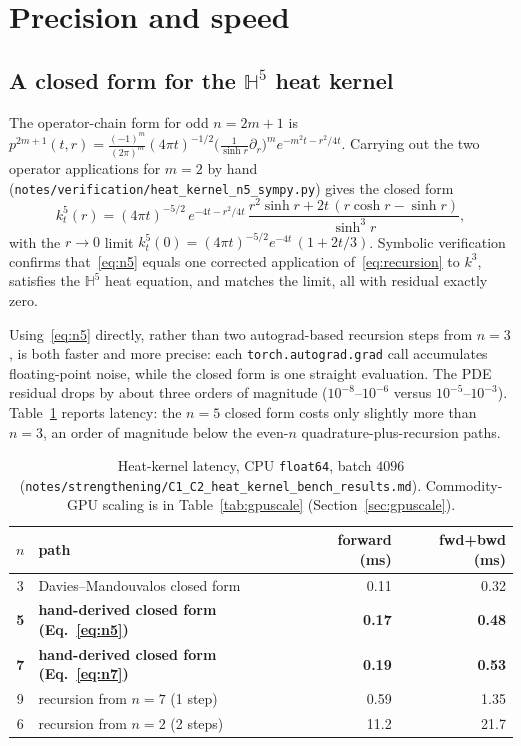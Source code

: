 \documentclass{article}
\newcommand{\Hyp}{\mathbb{H}}
\newcommand{\code}[1]{\texttt{#1}}
\begin{document}
\section{Precision and speed}
\label{sec:precision}

\subsection{A closed form for the $\Hyp^5$ heat kernel}
\label{sec:c2}

The operator-chain form for odd $n = 2m+1$
\citep[Thm.~8.21]{grigoryan2009heat} is
\(
  p^{2m+1}(t,r) = \frac{(-1)^m}{(2\pi)^m}(4\pi t)^{-1/2}
  \big(\tfrac{1}{\sinh r}\partial_r\big)^m e^{-m^2 t - r^2/4t}.
\)
Carrying out the two operator applications for $m = 2$ by hand
(\code{notes/verification/heat\_kernel\_n5\_sympy.py}) gives the closed
form
\begin{equation}
  k^5_t(r) = (4\pi t)^{-5/2}\, e^{-4t - r^2/4t}\,
  \frac{r^2 \sinh r + 2t\,(r\cosh r - \sinh r)}{\sinh^3 r},
  \label{eq:n5}
\end{equation}
with the $r \to 0$ limit
$k^5_t(0) = (4\pi t)^{-5/2} e^{-4t}\,(1 + 2t/3)$. Symbolic verification
confirms that~\eqref{eq:n5} equals one corrected application
of~\eqref{eq:recursion} to $k^3$, satisfies the $\Hyp^5$ heat equation,
and matches the limit, all with residual exactly zero.

Using~\eqref{eq:n5} directly, rather than two autograd-based recursion
steps from $n = 3$, is both faster and more precise: each
\code{torch.autograd.grad} call accumulates floating-point noise, while
the closed form is one straight evaluation. The PDE residual drops by
about three orders of magnitude ($10^{-8}$--$10^{-6}$ versus
$10^{-5}$--$10^{-3}$). Table~\ref{tab:heatperf} reports latency: the
$n = 5$ closed form costs only slightly more than $n = 3$, an order of
magnitude below the even-$n$ quadrature-plus-recursion paths.

\begin{table}[t]
  \centering
  \caption{Heat-kernel latency, CPU \code{float64}, batch $4096$
  (\code{notes/strengthening/C1\_C2\_heat\_kernel\_bench\_results.md}).
  Commodity-GPU scaling is in Table~\ref{tab:gpuscale}
  (Section~\ref{sec:gpuscale}).}
  \label{tab:heatperf}
  \begin{tabular}{clrr}
    \toprule
    $n$ & path & forward (ms) & fwd+bwd (ms) \\
    \midrule
    3 & Davies--Mandouvalos closed form & 0.11 & 0.32 \\
    \textbf{5} & \textbf{hand-derived closed form (Eq.~\ref{eq:n5})} & \textbf{0.17} & \textbf{0.48} \\
    \textbf{7} & \textbf{hand-derived closed form (Eq.~\ref{eq:n7})} & \textbf{0.19} & \textbf{0.53} \\
    9 & recursion from $n=7$ (1 step) & 0.59 & 1.35 \\
    6 & recursion from $n=2$ (2 steps) & 11.2 & 21.7 \\
    \bottomrule
  \end{tabular}
\end{table}
\end{document}
